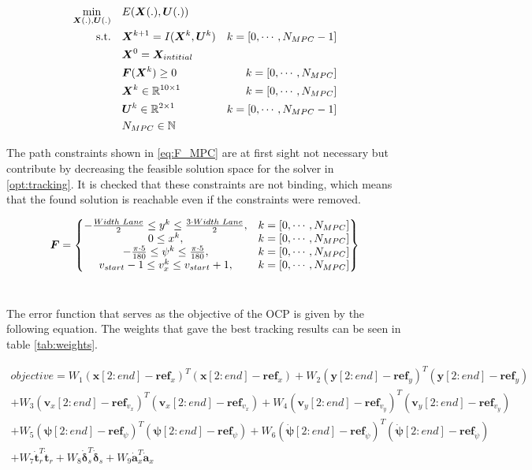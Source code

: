 \begin{equation}\label{opt:tracking}
\begin{aligned}
\min_{\bm{X}(.),\bm{U}(.)} \quad &  E(\bm{X}(.),\bm{U}(.)) \\
\textrm{s.t.} \quad & \bm{X}^{k+1} = I(\bm{X}^{k}, \bm{U}^{k}) & k = [0,\cdots, N_{MPC}-1]\\
& \bm{X}^{0} = \bm{X}_{intitial} \\
& \bm{F}(\bm{X}^{k}) \geq 0	& k = [0,\cdots, N_{MPC}]\\
& \bm{X}^{k}\in \mathbb{R}^{10\times 1}  & k = [0,\cdots, N_{MPC}]\\
& \bm{U}^{k}\in \mathbb{R}^{2\times 1} \hspace{3 mm} & k = [0,\cdots, N_{MPC}-1]\\
&  N_{MPC} \in \mathbb{N}
\end{aligned}
\end{equation}

The path constraints shown in \ref{eq:F_MPC} are at first sight not necessary but contribute by decreasing the feasible solution space for the solver in \ref{opt:tracking}. It is checked that these constraints are not binding, which means that the found solution is reachable even if the constraints were removed. 

\begin{equation}\label{eq:F_MPC}
\bm{F} =
\begin{Bmatrix}
-\frac{Width\hspace{1mm}Lane}{2} \leq y^k \leq \frac{3\cdot Width\hspace{1mm}Lane}{2}, & k = [0,\cdots, N_{MPC}] \\
0 \leq x^k, & k = [0,\cdots, N_{MPC}] \\
-\frac{\pi\cdot 5}{180} \leq \psi^k \leq \frac{\pi\cdot 5}{180}, & k = [0,\cdots, N_{MPC}] \\
v_{start}-1 \leq v_x^k \leq v_{start}+1, & k = [0,\cdots, N_{MPC}]
\end{Bmatrix}
\end{equation}\

The error function that serves as the objective of the OCP is given by the following equation. The weights that gave the best tracking results can be seen in table \ref{tab:weights}.

\begin{multline*} 
objective=W_1(\bm{x}[2:end]-\bm{ref}_x)^T(\bm{x}[2:end]-\bm{ref}_x)+W_2(\bm{y}[2:end]-\bm{ref}_y)^T(\bm{y}[2:end]-\bm{ref}_y)\\
+W_3(\bm{v}_x[2:end]-\bm{ref}_{v_x})^T(\bm{v}_x[2:end]-\bm{ref}_{v_x})+W_4(\bm{v}_y[2:end]-\bm{ref}_{v_y})^T(\bm{v}_y[2:end]-\bm{ref}_{v_y})\\+W_5(\bm{\psi}[2:end]-\bm{ref}_{\psi})^T(\bm{\psi}[2:end]-\bm{ref}_\psi)
+W_6(\bm{\dot{\psi}}[2:end]-\bm{ref}_{\dot{\psi}})^T(\bm{\dot{\psi}}[2:end]-\bm{ref}_{\dot{\psi}})\\ + W_7\dot{\bm{t}}_r^T\dot{\bm{t}}_r+W_8\dot{\bm{\delta}}_s^T\dot{\bm{\delta}}_s + W_9\dot{\bm{a}}_x^T\dot{\bm{a}}_x
\end{multline*}

